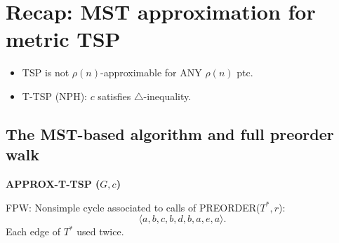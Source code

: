 \section{Recap: MST approximation for metric TSP}
\begin{itemize}
\item TSP is not $\rho(n)$-approximable for ANY $\rho(n)$ ptc.
\item T-TSP (NPH): $c$ satisfies $\triangle$-inequality.
\end{itemize}
\subsection{The MST-based algorithm and full preorder walk}
\begin{notesalgorithm}
\textbf{APPROX-T-TSP ($G,c$)}
\begin{notespseudocode}
\end{notespseudocode}
\end{notesalgorithm}
FPW: Nonsimple cycle associated to calls of PREORDER($T^*,r$):
\[\langle a,b,c,b,d,b,a,e,a\rangle.\]
Each edge of $T^*$ used twice.
